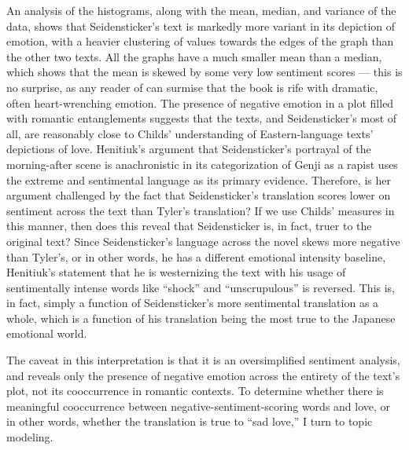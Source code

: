 \documentclass[12pt]{article}
\begin{document}
\begin{flushleft}
\begin{spacing}{2.0}
An analysis of the histograms, along with the mean, median, and variance of the data, shows that Seidensticker's text is markedly more variant in its depiction of emotion, with a heavier clustering of values towards the edges of the graph than the other two texts. All the graphs have a much smaller mean than a median, which shows that the mean is skewed by some very low sentiment scores --- this is no surprise, as any reader of  can surmise that the book is rife with dramatic, often heart-wrenching emotion. The presence of negative emotion in a plot filled with romantic entanglements suggests that the texts, and Seidensticker's most of all, are reasonably close to Childs' understanding of Eastern-language texts' depictions of love. Henitiuk's argument that Seidensticker's portrayal of the morning-after scene is anachronistic in its categorization of Genji as a rapist uses the extreme and sentimental language as its primary evidence. Therefore, is her argument challenged by the fact that Seidensticker's translation scores lower on sentiment across the text than Tyler's translation? If we use Childs' measures in this manner, then does this reveal that  Seidensticker is, in fact, truer to the original text? Since Seidensticker's language across the novel skews more negative than Tyler's, or in other words, he has a different emotional intensity baseline, Henitiuk's statement that he is westernizing the text with his usage of sentimentally intense words like ``shock'' and ``unscrupulous'' is reversed. This is, in fact, simply a function of Seidensticker's more sentimental translation as a whole, which is a function of his translation being the most true to the Japanese emotional world. 

The caveat in this interpretation is that it is an oversimplified sentiment analysis, and reveals only the presence of negative emotion across the entirety of the text's plot, not its cooccurrence in romantic contexts. To determine whether there is meaningful cooccurrence between negative-sentiment-scoring words and love, or in other words, whether the translation is true to ``sad love,'' I turn to topic modeling. 


\end{spacing}
\end{flushleft}
\end{document}
